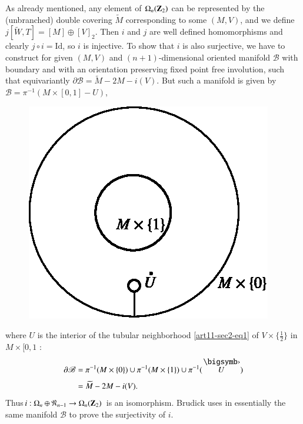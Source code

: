 As already mentioned, any element of $\Omega_{n}(\mathbf{Z}_{2})$ can be represented by the (unbranched) double covering $\widetilde{M}$ corresponding to some $(M,V)$, and we define $j[\widetilde{W},T]=[M]\oplus [V]_{2}$. Then $i$ and $j$ are well defined homomorphisms and clearly $j\circ i=\text{Id}$, so $i$ is injective. To show that $i$ is also surjective, we have to construct for given $(M,V)$ and $(n+1)$-dimensional oriented manifold $\mathscr{B}$ with boundary and with an orientation preserving fixed point free involution, such that equivariantly $\partial \mathscr{B}=\widetilde{M}-2M-i(V)$. But such a manifold is given by $\mathscr{B}=\pi^{-1}(M\times [0,1]-U)$,
\begin{figure}[H]
\centering
\includegraphics{src/chap11/fig7.eps}
\end{figure}
\noindent
where $U$ is the interior of the tubular neighborhood \eqref{art11-sec2-eq1} of $V\times \{\frac{1}{2}\}$ in $M\times [0,1$ :
\begin{align*}
\partial \mathscr{B} &= \pi^{-1}(M\times \{0\})\cup \pi^{-1}(M\times \{1\})\cup \pi^{-1}(\overdot{U})\\[3pt]
&= \widetilde{M}-2M-i(V).
\end{align*}
Thus\pageoriginale $i:\Omega_{n}\oplus \mathfrak{N}_{n-1}\to \Omega_{n}(\mathbf{Z}_{2})$ is an isomorphism. Brudick uses in \cite{art11-key4} essentially the same manifold $\mathscr{B}$ to prove the surjectivity of $i$.


